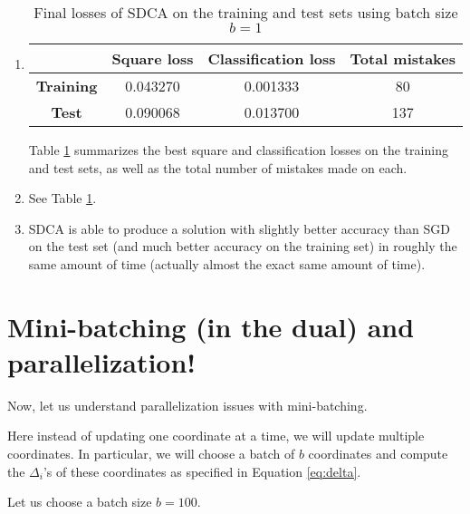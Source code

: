 \documentclass{article}
\begin{document}
\begin{enumerate}
	\newpage

	\item
	\begin{table}[h!]
		\centering
		\begin{tabular}{|c|c|c|c|}\hline
		     & {\bf Square loss} & {\bf Classification loss} & {\bf Total mistakes}  \\ \hline
		     \textbf{Training}	& 0.043270	& 0.001333	 & 80	\\ \hline
		     \textbf{Test}    	& 0.090068	& 0.013700	 & 137	\\ \hline
		\end{tabular}
		\caption{Final losses of SDCA on the training and test sets using batch size $b=1$}
		\label{tab:SDCA_final_loss_b1}
	\end{table}
	Table \ref{tab:SDCA_final_loss_b1} summarizes the best square and classification losses on the training and test sets, as well as the total number of mistakes made on each.

	\item See Table \ref{tab:SDCA_final_loss_b1}.

	\item SDCA is able to produce a solution with slightly better accuracy than SGD on the test set (and much better accuracy on the training set) in roughly the same amount of time (actually almost the exact same amount of time).
\end{enumerate}


\section{Mini-batching (in the dual) and parallelization!}
Now, let us understand parallelization issues with mini-batching. 

Here instead of updating one coordinate at a time, we will update multiple coordinates. In particular, we will choose a batch of  $b$ coordinates and compute the $\Delta_i$'s of these coordinates as specified in Equation \eqref{eq:delta}.
 
Let us choose a batch size $b=100$.
\end{document}
